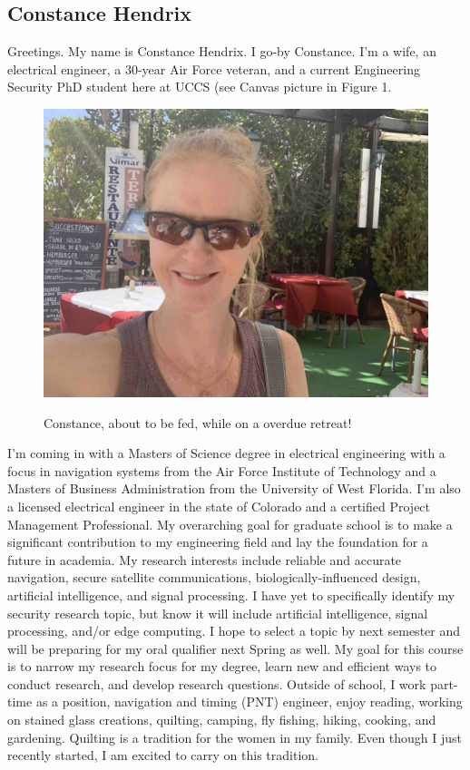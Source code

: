 
 \subsection{Constance Hendrix}
Greetings.  My name is Constance Hendrix.  I go-by Constance.  I’m a wife, an electrical engineer, a 30-year Air Force veteran, and a current Engineering Security PhD student here at UCCS (see Canvas picture in Figure 1. 
\begin{figure}[h]
    \centering
    \includegraphics[scale=0.06]{hendrix_canvas.jpg}
    \label{fig:me}
    \caption{Constance, about to be fed, while on a overdue retreat!}
\end{figure}
I’m coming in with a Masters of Science degree in electrical engineering with a focus in navigation systems from the Air Force Institute of Technology and a Masters of Business Administration from the University of West Florida.  I'm also a licensed electrical engineer in the state of Colorado and a certified Project Management Professional. My overarching goal for graduate school is to make a significant contribution to my engineering field and lay the foundation for a future in academia.  My research interests include reliable and accurate navigation, secure satellite communications, biologically-influenced design, artificial intelligence, and signal processing.  I have yet to specifically identify my security research topic, but know it will include artificial intelligence, signal processing, and/or edge computing. I hope to select a topic by next semester and will be preparing for my oral qualifier next Spring as well.  My goal for this course is to narrow my research focus for my degree, learn new and efficient ways to conduct research, and develop research questions. Outside of school, I work part-time as a position, navigation and timing (PNT) engineer, enjoy reading, working on stained glass creations, quilting, camping, fly fishing, hiking, cooking, and gardening.  Quilting is a tradition for the women in my family.  Even though I just recently started, I am excited to carry on this tradition. \\

